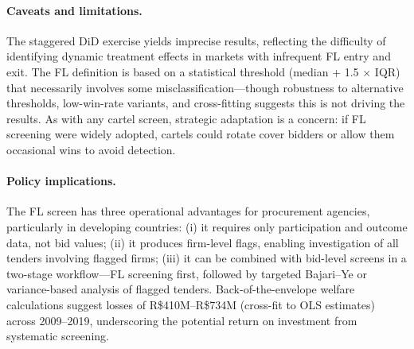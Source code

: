 \paragraph{Caveats and limitations.}
The staggered DiD exercise yields imprecise results, reflecting the
difficulty of identifying dynamic treatment effects in markets with
infrequent FL entry and exit. The FL definition is based on a
statistical threshold (median + 1.5 $\times$ IQR) that necessarily
involves some misclassification---though robustness to alternative
thresholds, low-win-rate variants, and cross-fitting suggests this is
not driving the results. As with any cartel screen, strategic adaptation
is a concern: if FL screening were widely adopted, cartels could rotate
cover bidders or allow them occasional wins to avoid detection.

\paragraph{Policy implications.}
The FL screen has three operational advantages for procurement agencies,
particularly in developing countries: (i) it requires only participation
and outcome data, not bid values; (ii) it produces firm-level flags,
enabling investigation of all tenders involving flagged firms; (iii) it
can be combined with bid-level screens in a two-stage workflow---FL
screening first, followed by targeted Bajari--Ye or variance-based
analysis of flagged tenders. Back-of-the-envelope welfare calculations suggest losses of %
R\$410M--R\$734M (cross-fit to OLS estimates) across 2009--2019,
underscoring the potential return on investment from systematic screening.


